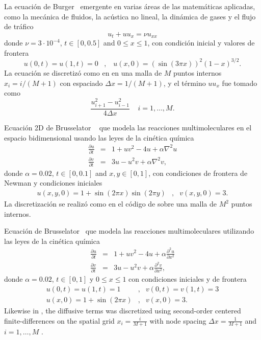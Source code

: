 \begin{example}\label{ex:Burger}
     La ecuación de Burger~\cite{tokman2006efficient} emergente en varias áreas de las matemáticas aplicadas, como la mecánica de fluidos, la acústica no lineal, la dinámica de gases y el flujo de tráfico
    \[ u_t+uu_x=\nu u_{xx} \]
    donde $\nu = 3\cdot10^{-4}$, $t\in [0,0\mathord{.}5]$ and $0\leq x\leq 1$, con condición inicial y valores de frontera
    \begin{equation*}
    u(0,t)=u(1,t)=0 \;\;\; ,   \;\;\;  u(x,0)=(\sin(3\pi x))^{2}(1-x)^{3/2}.
    \end{equation*}
    La ecuación se discretizó como en \cite{tokman2006efficient} en una malla de $M$ puntos internos $x_i = i/(M+1)$ con espaciado $\Delta x=1/(M+1)$, y el término $uu_x$ fue tomado como
    \[ \frac{u_{i+1}^{2}-u_{i-1}^{2}}{4\Delta x} \;\;\;\;  i=1,\ldots,M.\]
\end{example}

\begin{example}\label{ex:Brus2D}
    Ecuación 2D de Brusselator ~\cite{lefever1971chemical,tokman2012new} que modela las reacciones multimoleculares en el espacio bidimensional usando las leyes de la cinética química
    \begin{eqnarray*}
        \frac{\partial u}{\partial t} &=&1+uv^{2}-4u+\alpha \nabla^{2}u\\
        \frac{\partial v}{\partial t}&=&3u-u^{2}v+\alpha \nabla^{2}v,
    \end{eqnarray*}
    donde $\alpha = 0\mathord{.}02$, $t\in[0, 0\mathord{.}1]$ and $x,y\in[0,1]$,
    con condiciones de frontera de Newman y condiciones iniciales
    \begin{eqnarray*}
        u(x,y,0)=1+\sin(2\pi x)\sin(2\pi y) &,& v(x,y,0)=3.
    \end{eqnarray*}
    La discretización se realizó como en el código de \cite{jansing2011expode} sobre una malla de $M^2$ puntos internos.
\end{example}

\begin{example}\label{ex:Brus}
    Ecuación de Brusselator~\cite{lefever1971chemical,tokman2006efficient} que modela las reacciones multimoleculares utilizando las leyes de la cinética química
    \begin{eqnarray*}
        \frac{\partial u}{\partial t}&=&1+uv^{2}-4u+\alpha \frac{\partial ^{2}u}{\partial x^{2}}\\
        \frac{\partial v}{\partial t}&=&3u-u^{2}v+\alpha \frac{\partial ^{2}v}{\partial x^{2}},
    \end{eqnarray*}
    donde $\alpha = 0\mathord{.}02$, $t\in [0,1]$ y $0\leq x \leq 1$ con condiciones iniciales y de frontera
    \begin{eqnarray*}
        u(0,t)=u(1,t)=1 &,& v(0,t)=v(1,t)=3\\
        u(x,0)=1+\sin(2\pi x) &,& v(x,0)=3 .
    \end{eqnarray*}
    Likewise in \cite{tokman2006efficient}, the diffusive terms was discretized using second-order centered finite-differences on the spatial grid $x_i=\frac{i}{M+1}$ with node spacing $\Delta x = \frac{1}{M+1}$ and $i=1,\ldots,M$ .
\end{example}

